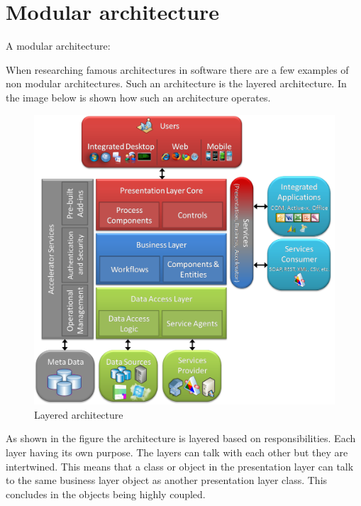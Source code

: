 \chapter{Modular architecture}
\label{sec:ModularArchitecture}

A modular architecture:

When researching famous architectures in software there are a few examples of non modular architectures. Such an architecture is the layered architecture. In the image below is shown how such an architecture operates.

\begin{figure}[H]
	\includegraphics[width=\linewidth]{layered_architecture.png}
	\caption{Layered architecture \cite{layeredArchitecture}}
\end{figure}

As shown in the figure the architecture is layered based on responsibilities. Each layer having its own purpose. The layers can talk with each other but they are intertwined. This means that a class or object in the presentation layer can talk to the same business layer object as another presentation layer class. This concludes in the objects being highly coupled.


